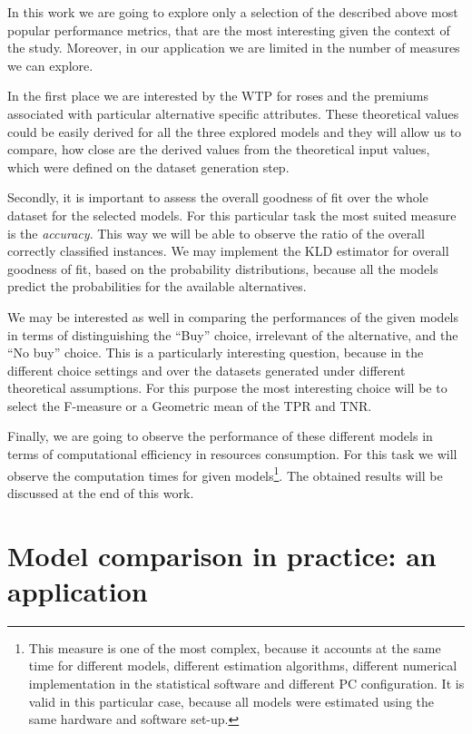 \documentclass[12pt,]{article}
\let\rmarkdownfootnote\footnote%
\def\footnote{\protect\rmarkdownfootnote}
\begin{document}
In this work we are going to explore only a selection of the described
above most popular performance metrics, that are the most interesting
given the context of the study. Moreover, in our application we are
limited in the number of measures we can explore.

In the first place we are interested by the WTP for roses and the
premiums associated with particular alternative specific attributes.
These theoretical values could be easily derived for all the three
explored models and they will allow us to compare, how close are the
derived values from the theoretical input values, which were defined on
the dataset generation step.

Secondly, it is important to assess the overall goodness of fit over the
whole dataset for the selected models. For this particular task the most
suited measure is the \emph{accuracy}. This way we will be able to
observe the ratio of the overall correctly classified instances. We may
implement the KLD estimator for overall goodness of fit, based on the
probability distributions, because all the models predict the
probabilities for the available alternatives.

We may be interested as well in comparing the performances of the given
models in terms of distinguishing the ``Buy'' choice, irrelevant of the
alternative, and the ``No buy'' choice. This is a particularly
interesting question, because in the different choice settings and over
the datasets generated under different theoretical assumptions. For this
purpose the most interesting choice will be to select the F-measure or a
Geometric mean of the TPR and TNR.

Finally, we are going to observe the performance of these different
models in terms of computational efficiency in resources consumption.
For this task we will observe the computation times for given
models\footnote{This measure is one of the most complex, because it
  accounts at the same time for different models, different estimation
  algorithms, different numerical implementation in the statistical
  software and different PC configuration. It is valid in this
  particular case, because all models were estimated using the same
  hardware and software set-up.}. The obtained results will be discussed
at the end of this work.

\newpage

\hypertarget{model-comparison-in-practice-an-application}{%
\section{Model comparison in practice: an
application}\label{model-comparison-in-practice-an-application}}
\end{document}
